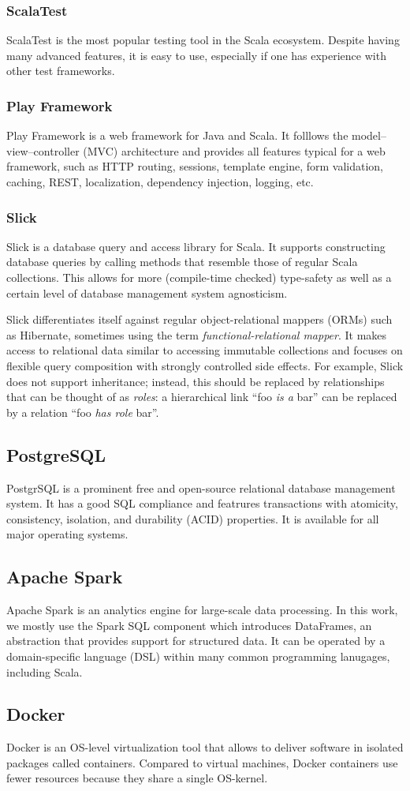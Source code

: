 \subsubsection{ScalaTest}
ScalaTest is the most popular testing tool in the Scala ecosystem.
Despite having many advanced features, it is easy to use, especially if one has experience with other test frameworks.

\subsubsection{Play Framework}
Play Framework is a web framework for Java and Scala.
It folllows the model--view--controller (MVC) architecture and provides all features typical for a web framework, such as  HTTP routing, sessions, template engine, form validation, caching, REST, localization, dependency injection, logging, etc.


\subsubsection{Slick}
Slick is a database query and access library for Scala.
It supports constructing database queries by calling methods that resemble those of regular Scala collections.
This allows for more (compile-time checked) type-safety as well as a certain level of database management system agnosticism.

Slick differentiates itself against regular object-relational mappers (ORMs) such as Hibernate, sometimes using the term \textit{functional-relational mapper}.
It makes access to relational data similar to accessing immutable collections and focuses on flexible query composition with strongly controlled side effects.
For example, Slick does not support inheritance; instead, this should be replaced by relationships that can be thought of as \textit{roles}: a hierarchical link \enquote{foo \textit{is a} bar} can be replaced by a relation \enquote{foo \textit{has role} bar}.

\subsection{PostgreSQL}
PostgrSQL is a prominent free and open-source relational database management system.
It has a good SQL compliance and featrures transactions with atomicity, consistency, isolation, and durability (ACID) properties.
It is available for all major operating systems.

\subsection{Apache Spark}
Apache Spark is an analytics engine for large-scale data processing.
In this work, we mostly use the Spark SQL component which introduces DataFrames, an abstraction that provides support for structured data.
It can be operated by a domain-specific language (DSL) within many common programming lanugages, including Scala.

\subsection{Docker}
Docker is an OS-level virtualization tool that allows to deliver software in isolated packages called containers.
Compared to virtual machines, Docker containers use fewer resources because they share a single OS-kernel.
